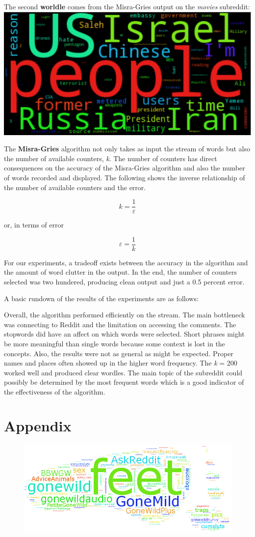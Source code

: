 \documentclass[12pt]{article}
\numberwithin{equation}{section}
\begin{document}
The second \textbf{worldle} comes from the Misra-Gries output on the \textit{movies} subreddit:
\centering
\includegraphics[scale=.5]{worldnews.png}

\raggedright

The \textbf{Misra-Gries} algorithm not only takes as input the stream of words but also the number of available counters, \textit{k}.  The number of counters has direct consequences on the accuracy of the Misra-Gries algorithm and also the number of words recorded and displayed.  The following shows the inverse relationship of the number of available counters and the error.    

\[k=\frac { 1 }{ \varepsilon  } \]  

or, in terms of error 

\[\varepsilon =\frac { 1 }{ k  } \]

For our experiments, a tradeoff exists between the accuracy in the algorithm and the amount of word clutter in the output.  In the end, the number of counters selected was two hundered, producing clean output and just a 0.5 percent error.

A basic rundown of the results of the experiments are as follows:



Overall, the algorithm performed efficiently on the stream.  The main bottleneck was connecting to Reddit and the limitation on accessing the comments.  The stopwords did have an affect on which words were selected.  Short phrases might be more meaningful than single words because some context is lost in the concepts.  Also, the results were not as general as might be expected.  Proper names and places often showed up in the higher word frequency.  The \textit{k} = 200 worked well and produced clear wordles.  The main topic of the subreddit could possibly be determined by the most frequent words which is a good indicator of the effectiveness of the algorithm.   

\section*{Appendix}
\begin{figure}[h!]
	\centering
	\includegraphics[scale=.4]{feet_16.png}
\end{figure}

	
	
	
\end{document}
